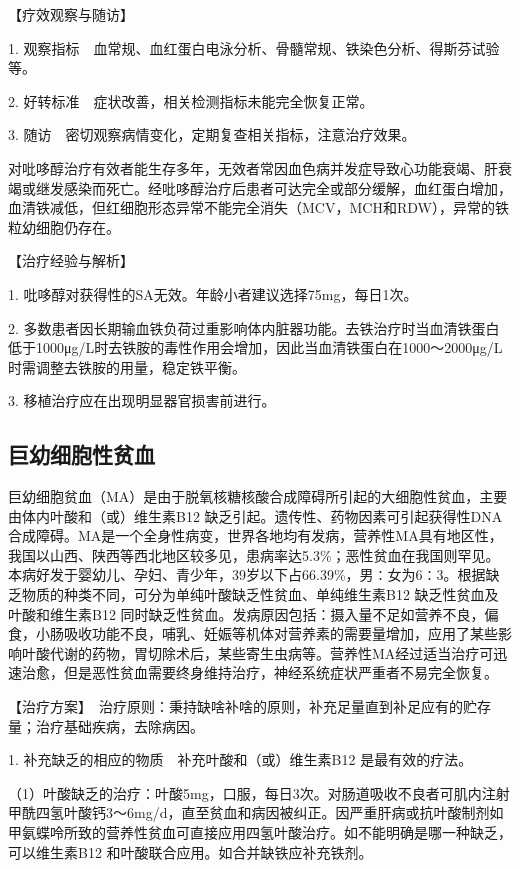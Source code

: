 【疗效观察与随访】

1.
观察指标　血常规、血红蛋白电泳分析、骨髓常规、铁染色分析、得斯芬试验等。

2. 好转标准　症状改善，相关检测指标未能完全恢复正常。

3. 随访　密切观察病情变化，定期复查相关指标，注意治疗效果。

对吡哆醇治疗有效者能生存多年，无效者常因血色病并发症导致心功能衰竭、肝衰竭或继发感染而死亡。经吡哆醇治疗后患者可达完全或部分缓解，血红蛋白增加，血清铁减低，但红细胞形态异常不能完全消失（MCV，MCH和RDW），异常的铁粒幼细胞仍存在。

【治疗经验与解析】

1. 吡哆醇对获得性的SA无效。年龄小者建议选择75mg，每日1次。

2.
多数患者因长期输血铁负荷过重影响体内脏器功能。去铁治疗时当血清铁蛋白低于1000μg/L时去铁胺的毒性作用会增加，因此当血清铁蛋白在1000～2000μg/L时需调整去铁胺的用量，稳定铁平衡。

3. 移植治疗应在出现明显器官损害前进行。

\subsection{巨幼细胞性贫血}

巨幼细胞贫血（MA）是由于脱氧核糖核酸合成障碍所引起的大细胞性贫血，主要由体内叶酸和（或）维生素B{12}
缺乏引起。遗传性、药物因素可引起获得性DNA合成障碍。MA是一个全身性病变，世界各地均有发病，营养性MA具有地区性，我国以山西、陕西等西北地区较多见，患病率达5.3\%；恶性贫血在我国则罕见。本病好发于婴幼儿、孕妇、青少年，39岁以下占66.39\%，男∶女为6∶3。根据缺乏物质的种类不同，可分为单纯叶酸缺乏性贫血、单纯维生素B{12}
缺乏性贫血及叶酸和维生素B{12}
同时缺乏性贫血。发病原因包括：摄入量不足如营养不良，偏食，小肠吸收功能不良，哺乳、妊娠等机体对营养素的需要量增加，应用了某些影响叶酸代谢的药物，胃切除术后，某些寄生虫病等。营养性MA经过适当治疗可迅速治愈，但是恶性贫血需要终身维持治疗，神经系统症状严重者不易完全恢复。

【治疗方案】　治疗原则：秉持缺啥补啥的原则，补充足量直到补足应有的贮存量；治疗基础疾病，去除病因。

1. 补充缺乏的相应的物质　补充叶酸和（或）维生素B{12} 是最有效的疗法。

（1）叶酸缺乏的治疗：叶酸5mg，口服，每日3次。对肠道吸收不良者可肌内注射甲酰四氢叶酸钙3～6mg/d，直至贫血和病因被纠正。因严重肝病或抗叶酸制剂如甲氨蝶呤所致的营养性贫血可直接应用四氢叶酸治疗。如不能明确是哪一种缺乏，可以维生素B{12}
和叶酸联合应用。如合并缺铁应补充铁剂。

